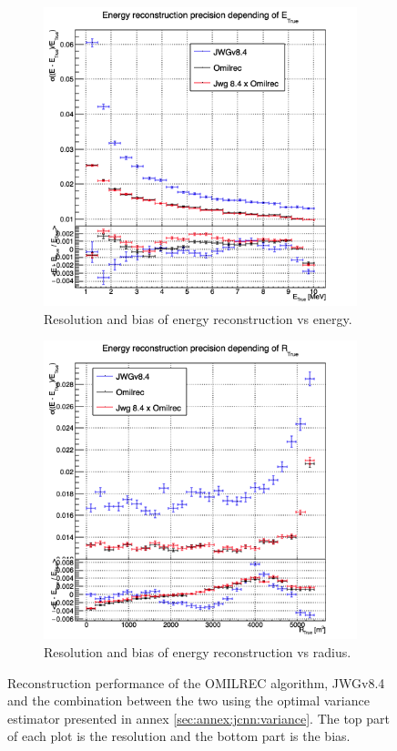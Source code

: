 \documentclass[../main.tex]{subfiles}
\begin{document}
\begin{figure}[ht]
  \centering
  \begin{subfigure}[t]{0.48\linewidth}
    \centering
    \includegraphics[width=\linewidth]{images/jgnn/MSBvTE.png}
    \caption{Resolution and bias of energy reconstruction vs energy.}
    \label{fig:jgnn:MESBvETC}
  \end{subfigure}
  \begin{subfigure}[t]{0.48\linewidth}
    \centering
    \includegraphics[width=\linewidth]{images/jgnn/MESBvRT.png}
    \caption{Resolution and bias of energy reconstruction vs radius.}
    \label{fig:jgnn:MESBvRTC}
  \end{subfigure}
  \caption{Reconstruction performance of the OMILREC algorithm, JWGv8.4 and the combination between the two using the optimal variance estimator presented in annex \ref{sec:annex:jcnn:variance}. The top part of each plot is the resolution and the bottom part is the bias.}
  \label{fig:jgnn:results_1}
\end{figure}
\end{document}
